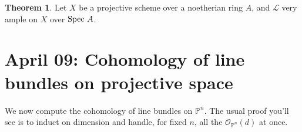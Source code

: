 \documentclass[10pt,reqno]{amsart}
\theoremstyle{definition}
\newtheorem{theorem}{Theorem}
\theoremstyle{remark}
\numberwithin{equation}{section}
\numberwithin{theorem}{section}
\newcommand{\OO}{{\mathcal O}}
\newcommand{\spec}{\textup{Spec }}
\newcommand{\LL}{{\mathscr L}}
\newcommand{\PP}{{\mathbb P}}
\begin{document}
\begin{theorem} Let $X$ be a projective scheme over a noetherian ring $A$, and $\LL$ very ample on $X$ over $\spec A$.
\end{theorem}
\section{April 09: Cohomology of line bundles on projective space}
We now compute the cohomology of line bundles on $\PP^n$. The usual proof you'll see is to induct on dimension and handle, for fixed $n$, all the $\OO_{\PP^n}(d)$ at once.
\end{document}
